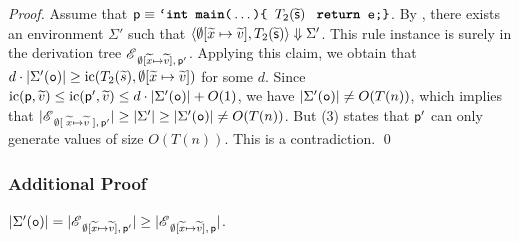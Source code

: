 \documentclass[runningheads]{llncs}
\begin{document}
\begin{proof}
Assume that $\mathsf{p}\equiv \texttt{`\textbf{int main}(}\dots\texttt{)\{ }T_2(\widetilde{\mathsf{s}})\;\texttt{ \textbf{return} e;\}}$.
By , there exists an environment $\Sigma'$ such that $\langle\emptyset[\widetilde{x}\mapsto\widetilde{v}],T_2(\widetilde{\mathsf{s}})\rangle\Downarrow{\Sigma'}$.
This rule instance is surely in the derivation tree $\mathscr{E}_{\;\emptyset[\widetilde{x}\mapsto\widetilde{v}],\,\mathsf{p}'}$.
Applying this claim, we obtain that $d\cdot\vert\Sigma'(\texttt{o})\vert\ge\mathrm{ic}(T_2(\widetilde{s}),\emptyset[\widetilde{x}\mapsto\widetilde{v}])$ for some $d$.
Since $\mathrm{ic}(\mathsf{p},\widetilde{v}) \le \mathrm{ic}(\mathsf{p}',\widetilde{v}) \le d\cdot\vert\Sigma'(\texttt{o})\vert + O(1)$, we have $\vert\Sigma'(\texttt{o})\vert \neq O(T(n))$, which implies that $\vert\mathscr{E}_{\;\emptyset[\;\widetilde{x}\mapsto\widetilde{v}\;],\,\mathsf{p}'}\vert\ge\vert\Sigma'\vert\ge\vert\Sigma'(\texttt{o})\vert\neq O(T(n))$. But (3) states that $\mathsf{p}'$ can only generate values of size $O(T(n))$.
This is a contradiction.
\qed
\end{proof}

\subsubsection{Additional Proof}\label{App_Claims}
\begin{claim}
    $\vert\Sigma'(\texttt{o})\vert=\vert\mathscr{E}_{\;\emptyset[\widetilde{x}\mapsto{\widetilde{v}}],\,\mathsf{p}'}\vert\ge\vert\mathscr{E}_{\;\emptyset[\widetilde{x}\mapsto{\widetilde{v}}],\,\mathsf{p}}\vert$.
\end{claim}
\end{document}
